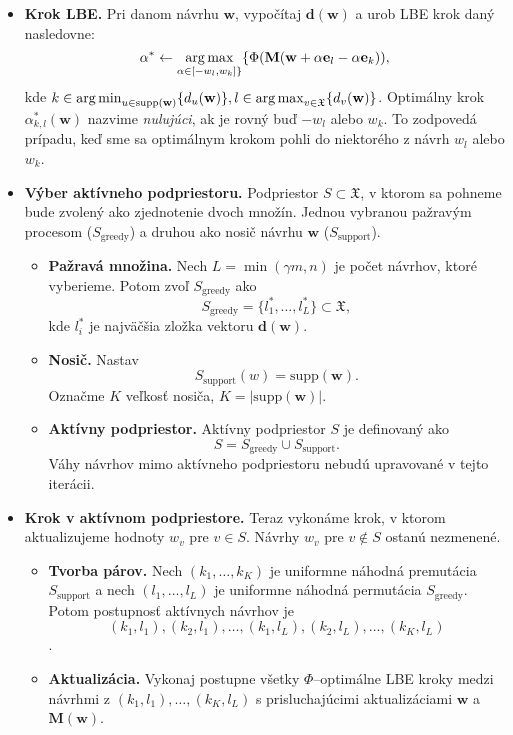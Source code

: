 \begin{itemize}
	\item \textbf{Krok LBE.} Pri danom návrhu $\mathbf w$, vypočítaj $\mathbf {d(w)}$ a urob LBE krok daný nasledovne: $$\alpha^* \leftarrow \operatorname*{arg\,max}_{\alpha \in [-w_l, w_k] \}} \{ \Phi(\mathbf M(\mathbf w+\alpha \mathbf e_l -\alpha \mathbf e_k)),$$ kde 
	$k \in \operatorname*{arg\,min}_{u \in \text{supp}(\mathbf w)} \{ d_u(\mathbf w)\}, l \in \operatorname*{arg\,max}_{v \in \mathfrak X} \{ d_v(\mathbf w)\}$. Optimálny krok $\alpha^*_{k,l}(\mathbf w)$ nazvime \textit{nulujúci}, ak je rovný buď $-w_l$ alebo $w_k$. To zodpovedá prípadu, keď sme sa optimálnym krokom pohli do niektorého z návrh $w_l$ alebo $w_k$.

	\item \textbf{Výber aktívneho podpriestoru.} Podpriestor $S \subset \mathfrak X$, v ktorom sa pohneme bude zvolený ako zjednotenie dvoch množín. Jednou vybranou pažravým procesom ($S_\text{greedy}$) a druhou ako nosič návrhu $\mathbf w$ ($S_\text{support}$).
	\begin{itemize}
		\item \textbf{Pažravá množina.} Nech $L=\min (\gamma m, n)$ je počet návrhov, ktoré vyberieme. Potom zvoľ $S_\text{greedy}$ ako $$S_\text{greedy} = \{l_1^*, \dots, l_L^* \} \subset \mathfrak X,$$ kde $l_i^*$ je najväčšia zložka vektoru $\mathbf d(\mathbf w)$.
		\item \textbf{Nosič.} Nastav $$S_\text{support}(w)=\text{supp}(\mathbf w).$$ Označme $K$ veľkosť nosiča, $K= |\text{supp}(\mathbf w)|$.
		\item \textbf{Aktívny podpriestor.} Aktívny podpriestor $S$ je definovaný ako $$S=S_\text{greedy} \cup S_\text{support}.$$ Váhy návrhov mimo aktívneho podpriestoru nebudú upravované v tejto iterácii.
	\end{itemize}

	\item \textbf{Krok v aktívnom podpriestore.} Teraz vykonáme krok, v ktorom aktualizujeme hodnoty $w_v$ pre $v \in S$. Návrhy $w_v$ pre $v \not \in S$ ostanú nezmenené.
	\begin{itemize}
		\item \textbf{Tvorba párov.} Nech $(k_1, \dots, k_K)$ je uniformne náhodná premutácia $S_\text{support}$ a nech $(l_1, \dots, l_L)$ je uniformne náhodná permutácia $S_\text{greedy}$. Potom postupnosť aktívnych návrhov je $$ (k_1,l_1), (k_2, l_1), \dots, (k_1, l_L), (k_2,l_L), \dots, (k_K, l_L) $$.
		\item \textbf{Aktualizácia.} Vykonaj postupne všetky $\Phi$--optimálne LBE kroky medzi návrhmi z $ (k_1,l_1), \dots, (k_K, l_L)$ s prisluchajúcimi aktualizáciami $\mathbf w$ a $\mathbf {M(w)}$.
	\end{itemize}
\end{itemize}

